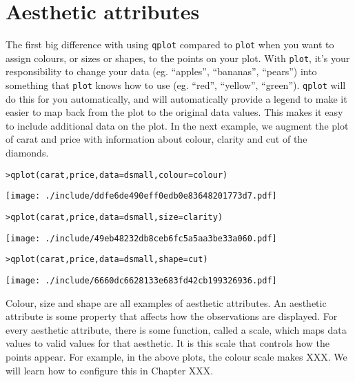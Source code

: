 \section{Aesthetic attributes}\label{sec:aesthetic_attributes}

The first big difference with using {\tt qplot} compared to {\tt plot} when you want to assign colours, or sizes or shapes, to the points on your plot.  With {\tt plot}, it's your responsibility to change your data (eg. ``apples'', ``bananas'', ``pears'') into something that {\tt plot} knows how to use (eg. ``red'', ``yellow'', ``green'').  {\tt qplot} will do this for you automatically, and will automatically provide a legend to make it easier to map back from the plot to the original data values.  This makes it easy to include additional data on the plot.  In the next example, we augment the plot of carat and price with information about colour, clarity and cut of the diamonds.

\begin{alltt}
> qplot(carat, price, data = dsmall, colour = colour)
\end{alltt}
\texttt{[image: ./include/ddfe6de490eff0edb0e83648201773d7.pdf]}
\begin{alltt}

> qplot(carat, price, data = dsmall, size = clarity)
\end{alltt}
\texttt{[image: ./include/49eb48232db8ceb6fc5a5aa3be33a060.pdf]}
\begin{alltt}

> qplot(carat, price, data = dsmall, shape = cut)
\end{alltt}
\texttt{[image: ./include/6660dc6628133e683fd42cb199326936.pdf]}
\begin{alltt}

\end{alltt}

Colour, size and shape are all examples of aesthetic attributes.  An aesthetic attribute is some property that affects how the observations are displayed.  For every aesthetic attribute, there is some function, called a scale, which maps data values to valid values for that aesthetic.  It is this scale that controls how the points appear.  For example, in the above plots, the colour scale makes XXX.  We will learn how to configure this in Chapter XXX.

